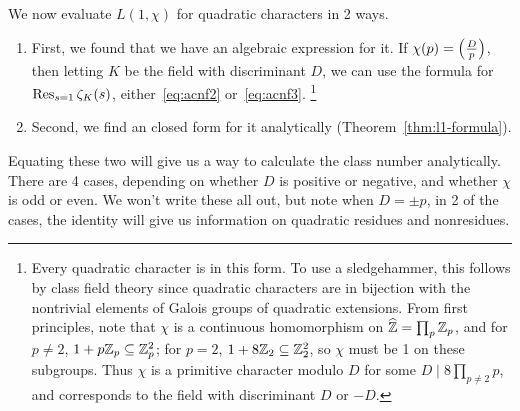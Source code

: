 We now evaluate $L(1,\chi)$ for quadratic characters in 2 ways.
\begin{enumerate}
\item
First, we found that we have an algebraic expression for it. If $\chi(p)=\left( {\frac{D}{p}} \right)$, then letting $K$ be the field with discriminant $D$, we can use the formula for $\operatorname{Res}_{s=1}\zeta_K(s)$, either~\eqref{eq:acnf2} or~\eqref{eq:acnf3}.
\footnote{Every quadratic character is in this form. To use a sledgehammer, this follows by class field theory since quadratic characters are in bijection with the nontrivial elements of Galois groups of quadratic extensions. From first principles, note that $\chi$ is a continuous homomorphism on $\widehat{\mathbb{Z}}=\prod_{p}\mathbb{Z}_p$, and for $p\ne 2$, $1+p\mathbb{Z}_p\subseteq \mathbb{Z}_p^2$; for $p=2$, $1+8\mathbb{Z}_2\subseteq \mathbb{Z}_2^2$, so $\chi$ must be 1 on these subgroups. Thus $\chi$ is a primitive character modulo $D$ for some $D\mid 8\prod_{p\ne 2}p$, and corresponds to the field with discriminant $D$ or $-D$.}
\item Second, we find an closed form for it analytically (Theorem~\ref{thm:l1-formula}).
\end{enumerate} 
Equating these two will give us a way to calculate the class number analytically. There are 4 cases, depending on whether $D$ is positive or negative, and whether $\chi$ is odd or even. We won't write these all out, but note when $D=\pm p$, in 2 of the cases, the identity will give us information on quadratic residues and nonresidues.

